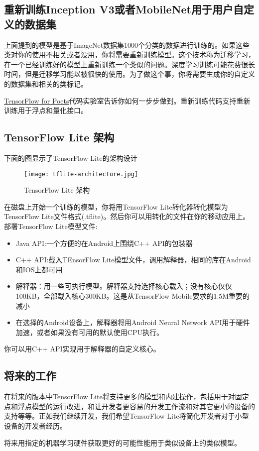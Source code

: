 \subsection{重新训练Inception V3或者MobileNet用于用户自定义的数据集}
上面提到的模型是基于ImageNet数据集1000个分类的数据进行训练的。如果这些类对你的使用不相关或者没用，你将需要重新训练模型。这个技术称为迁移学习，在一个已经训练好的模型上重新训练一个类似的问题。深度学习训练可能花费很长时间，但是迁移学习能以被很快的使用。为了做这个事，你将需要生成你的自定义的数据集和相关的类标记。

\href{https://codelabs.developers.google.com/codelabs/tensorflow-for-poets/?hl=zh-cn}{TensorFlow for Poets}代码实验室告诉你如何一步步做到。重新训练代码支持重新训练用于浮点和量化接口。
\subsection{TensorFlow Lite 架构}
下面的图显示了TensorFlow Lite的架构设计
\begin{figure}[H]
\centering
\texttt{[image: tflite-architecture.jpg]}
\caption{TensorFlow Lite 架构}
\end{figure}
在磁盘上开始一个训练的模型，你将用TensorFlow Lite转化器转化模型为TensorFlow Lite文件格式(.tflite)。然后你可以用转化的文件在你的移动应用上。
部署TensorFlow Lite模型文件:
\begin{itemize}
\item Java API:一个方便的在Android上围绕C++ API的包装器
\item C++ API:载入TEnsorFlow Lite模型文件，调用解释器，相同的库在Android和IOS上都可用
\item 解释器：用一些可执行模型。解释器支持选择核心载入；没有核心仅仅100KB，全部载入核心300KB。这是从TensorFlow Mobile要求的1.5M重要的减小
\item 在选择的Android设备上，解释器将用Android Neural Network API用于硬件加速，或者如果没有可用的默认使用CPU执行。
\end{itemize}
你可以用C++ API实现用于解释器的自定义核心。
\subsection{将来的工作}
在将来的版本中TensorFlow Lite将支持更多的模型和内建操作，包括用于对固定点和浮点模型的运行改进，和让开发者更容易的开发工作流和对其它更小的设备的支持等等。正如我们继续开发，我们希望TensorFlow Lite将简化开发者对于小型设备的开发者经历。

将来用指定的机器学习硬件获取更好的可能性能用于类似设备上的类似模型。
